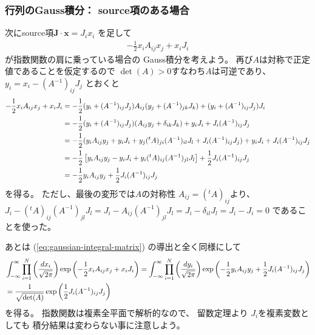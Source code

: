 \subsubsection{行列のGauss積分：
    source項のある場合}

次にsource項$\bm{J} \cdot \bm{x} = J_i x_i$
を足して
\begin{align}
    - \frac{1}{2}
    x_i A_{ij} x_j
    + x_i J_i
\end{align}
が指数関数の肩に乗っている場合の
Gauss積分を考えよう。
再び$A$は対称で正定値であることを仮定するので
$\det (A) > 0$すなわち$A$は可逆であり、
$y_i = x_i
    - (A^{-1})_{ij} J_j$
とおくと
\begin{align}
    - \frac{1}{2}
    x_i A_{ij} x_j
    + x_i J_i
&=
    - \frac{1}{2}
    (y_i + (A^{-1})_{ij} J_j)
    A_{ij}
    (y_j + (A^{-1})_{jk} J_k)
+
    (y_i + (A^{-1})_{ij} J_j)
    J_i
\notag\\&=
    - \frac{1}{2}
    (y_i + (A^{-1})_{ij} J_j)
    (A_{ij} y_j + \delta_{ik} J_k)
+
    y_i J_i
+
    J_i (A^{-1})_{ij} J_j
\notag\\&=
    - \frac{1}{2}
    (
        y_i A_{ij} y_j
        + y_i J_i
        + y_j ({}^t A)_{ji}
        (A^{-1})_{il} J_l
        + J_i (A^{-1})_{ij} J_j
    )
    + y_i J_i + J_i
    (A^{-1})_{ij} J_j
\notag\\&=
    - \frac{1}{2}
    \left[
        y_i A_{ij} y_j
        - y_i J_i
        + y_i ({}^t A)_{ij}
        (A^{-1})_{jl} J_l
    \right]
+
    \frac{1}{2} J_i
    (A^{-1})_{ij} J_j
\notag\\&=
    - \frac{1}{2}
    y_i A_{ij} y_j
    +
    \frac{1}{2} J_i
    (A^{-1})_{ij} J_j
\label{eq:variable-convert-with-non-homo-term}
\end{align}
を得る。
ただし、最後の変形では$A$の対称性
$A_{ij} = ({}^t A)_{ij}$より、
$ J_i - ({}^t A)_{ij}
    (A^{-1})_{jl} J_l
= J_i - A_{ij} (A^{-1})_{jl} J_l
= J_i - \delta_{il} J_l 
= J_i - J_i
= 0$
であることを使った。

あとは
(\ref{eq:gaussian-integral-matrix})
の導出と全く同様にして
\begin{align}
    &
    \int_{-\infty}^{\infty}
    \prod_{i=1}^{N}
    \left(
        \frac{dx_i}{ \sqrt{2\pi} }
    \right)
    \exp \left(
        - \frac{1}{2}
        x_i A_{ij} x_j
        + x_i J_i
    \right)
=
    \int_{-\infty}^{\infty}
    \prod_{i=1}^{N}
    \left(
        \frac{dy_i}{ \sqrt{2\pi} }
    \right)
    \exp \left(
        - \frac{1}{2}
        y_i A_{ij} y_j 
        + \frac{1}{2}
        J_i (A^{-1})_{ij} J_j
    \right)
\notag\\&=
    \frac{1}{ \sqrt{\det (A) } }
    \exp\left(
        \frac{1}{2}
        J_i (A^{-1})_{ij} J_j
    \right)
\label{eq:gaussian-integral-with-source}
\end{align}
を得る。
指数関数は複素全平面で解析的なので、
留数定理より
$J_i$を複素変数としても
積分結果は変わらない事に注意しよう。

